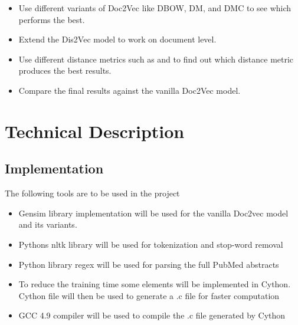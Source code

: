 \documentclass[12pt,a4paper] {article}
\begin{document}
\begin{itemize}
\begin{itemize}
\begin{itemize}
			\end{itemize} 
			
		\end{itemize}
		

		\item Use different variants of Doc2Vec like DBOW, DM, and DMC to see which performs the best.
		
		
		\item Extend the Dis2Vec \cite{ghosh2016characterizing} model to work on document level.
		
		\item Use different distance metrics such as \cite{sidorov2014soft} \cite{kusner2015word} and \cite{annoy} to find out which distance metric produces the best results.
		
		\item Compare the final results against the vanilla Doc2Vec model.
		
		
	\end{itemize}
	
	
	
	\section*{Technical Description} 
	\subsection*{Implementation}
	The following tools are to be used in the project
	
	\begin{itemize}
		\item Gensim library \cite{rehurek_lrec} implementation will be used for the vanilla Doc2vec model and its variants. 
		
		\item Pythons nltk library will be used for tokenization and stop-word removal
		
		\item Python library regex will be used for parsing the full PubMed abstracts 
		
		\item To reduce the training time some elements will be implemented in Cython. Cython file will then be used to generate a .c file for faster computation
		
		\item GCC 4.9 compiler will be used to compile the .c file generated by Cython 
		
		
	\end{itemize}
	
\end{document}
